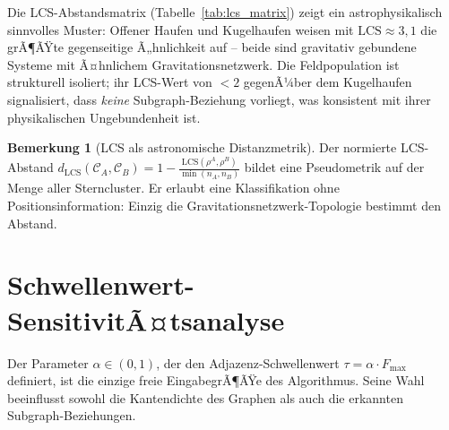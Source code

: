 ﻿\documentclass[a4paper,12pt]{report}
\theoremstyle{definition}
\newtheorem{bemerkung}{Bemerkung}
\begin{document}
Die LCS-Abstandsmatrix (Tabelle~\ref{tab:lcs_matrix}) zeigt ein astrophysikalisch sinnvolles Muster: Offener Haufen und Kugelhaufen weisen mit $\mathrm{LCS} \approx 3{,}1$ die grÃ¶ÃŸte gegenseitige Ã„hnlichkeit auf -- beide sind gravitativ gebundene Systeme mit Ã¤hnlichem Gravitationsnetzwerk. Die Feldpopulation ist strukturell isoliert; ihr LCS-Wert von $< 2$ gegenÃ¼ber dem Kugelhaufen signalisiert, dass \emph{keine} Subgraph-Beziehung vorliegt, was konsistent mit ihrer physikalischen Ungebundenheit ist.

\begin{bemerkung}[LCS als astronomische Distanzmetrik]
Der normierte LCS-Abstand $d_\mathrm{LCS}(\mathcal{C}_A, \mathcal{C}_B) = 1 - \frac{\mathrm{LCS}(\rho^A, \rho^B)}{\min(n_A, n_B)}$ bildet eine Pseudometrik auf der Menge aller Sterncluster. Er erlaubt eine Klassifikation ohne Positionsinformation: Einzig die Gravitationsnetzwerk-Topologie bestimmt den Abstand.
\end{bemerkung}

\section{Schwellenwert-SensitivitÃ¤tsanalyse}
\label{sec:empirie_schwelle}

Der Parameter $\alpha \in (0,1)$, der den Adjazenz-Schwellenwert $\tau = \alpha \cdot F_{\max}$ definiert, ist die einzige freie EingabegrÃ¶ÃŸe des Algorithmus. Seine Wahl beeinflusst sowohl die Kantendichte des Graphen als auch die erkannten Subgraph-Beziehungen.
\end{document}
